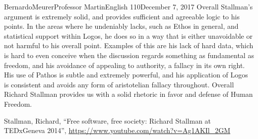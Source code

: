 \documentclass[12pt,letterpaper]{article}
\begin{document}
\begin{mla}{Bernardo}{Meurer}{Professor Martin}{English 110}{December 7, 2017}
        Overall Stallman's argument is extremely solid, and provides sufficient and agreeable logic to his points. In the areas where he undeniably lacks, such as Ethos in general, and statistical support within Logos, he does so in a way that is either unavoidable or not harmful to his overall point. Examples of this are his lack of hard data, which is hard to even conceive when the discussion regards something as fundamental as freedom, and his avoidance of appealing to authority, a fallacy in its own right. His use of Pathos is subtle and extremely powerful, and his application of Logos is consistent and avoids any form of aristotelian fallacy throughout. Overall Richard Stallman provides us with a solid rhetoric in favor and defense of Human Freedom.

        \newpage
        \begin{workscited}
            \bibent
            Stallman, Richard, ``Free software, free society: Richard Stallman at TEDxGeneva 2014'', \url{https://www.youtube.com/watch?v=Ag1AKIl_2GM}
        \end{workscited}
    \end{mla}
    
\end{document}
